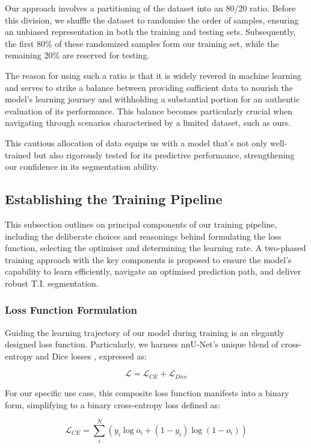 Our approach involves a partitioning of the dataset into an 80/20 ratio. Before this division, we shuffle the dataset to randomise the order of samples, ensuring an unbiased representation in both the training and testing sets. Subsequently, the first 80\% of these randomized samples form our training set, while the remaining 20\% are reserved for testing.

The reason for using such a ratio is that it is widely revered in machine learning and serves to strike a balance between providing sufficient data to nourish the model's learning journey and withholding a substantial portion for an authentic evaluation of its performance. This balance becomes particularly crucial when navigating through scenarios characterised by a limited dataset, such as ours.

This cautious allocation of data equips us with a model that's not only well-trained but also rigorously tested for its predictive performance, strengthening our confidence in its segmentation ability.

\subsection{Establishing the Training Pipeline}
This subsection outlines on principal components of our training pipeline, including the deliberate choices and reasonings behind formulating the loss function, selecting the optimiser and determining the learning rate. A two-phased training approach with the key components is proposed to ensure the model's capability to learn efficiently, navigate an optimised prediction path, and deliver robust T.I. segmentation.
\subsubsection*{Loss Function Formulation}
Guiding the learning trajectory of our model during training is an elegantly designed loss function. Particularly, we harness nnU-Net's unique blend of cross-entropy and Dice losses \cite{drozdzal2016importance}, expressed as:

\[
\mathcal{L} = \mathcal{L}_{CE} + \mathcal{L}_{Dice}
\]

For our specific use case, this composite loss function manifests into a binary form, simplifying to a binary cross-entropy loss defined as:

\[
\mathcal{L}_{CE} = \sum_{i}^{N}\left(y_{i}\log o_{i} + (1 - y_{i}) \log (1 - o_{i})\right)
\]

